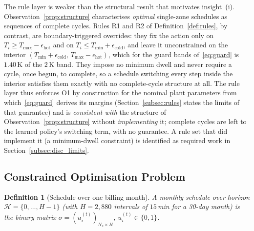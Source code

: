 \documentclass[3p,twocolumn,number]{elsarticle}
\newtheorem{definition}{Definition} \newtheorem{proposition}{Proposition} \newtheorem{remark}{Remark} \newtheorem{observation}{Observation} \newtheorem{corollary}{Corollary}
\newcommand{\sched}{\sigma}
\newcommand{\Tmin}{T_{\min}}
\newcommand{\Tmax}{T_{\max}}
\begin{document}
The rule layer is weaker than the structural result that motivates insight~(i). Observation~\ref{prop:structure} characterises \emph{optimal} single-zone schedules as sequences of complete cycles. Rules R1 and R2 of Definition~\ref{def:rules}, by contrast, are boundary-triggered overrides: they fix the action only on $T_i\ge\Tmax-\epsilon_{\mathrm{hot}}$ and on $T_i\le\Tmin+\epsilon_{\mathrm{cold}}$, and leave it unconstrained on the interior $(\Tmin+\epsilon_{\mathrm{cold}},\,\Tmax-\epsilon_{\mathrm{hot}})$, which for the guard bands of~\eqref{eq:guard} is $1.40\,$K of the $2\,$K band. They impose no minimum dwell and never require a cycle, once begun, to complete, so a schedule switching every step inside the interior satisfies them exactly with no complete-cycle structure at all. The rule layer thus enforces O1 by construction for the nominal plant parameters from which~\eqref{eq:guard} derives its margins (Section~\ref{subsec:rules} states the limits of that guarantee) and is \emph{consistent with} the structure of Observation~\ref{prop:structure} without \emph{implementing} it; complete cycles are left to the learned policy's switching term, with no guarantee. A rule set that did implement it (a minimum-dwell constraint) is identified as required work in Section~\ref{subsec:disc_limits}.
 
\subsection{Constrained Optimisation Problem}
\label{subsec:cop}
 
\begin{definition}[Schedule over one billing month]
\label{def:schedule}
A \emph{monthly schedule} over horizon $\mathcal{H}=\{0,\ldots,H-1\}$ (with $H=2{,}880$ intervals of $15\,$min for a 30-day month) is the binary matrix $\sched=(u_i^{(t)})_{N_z\times H}$, $u_i^{(t)}\in\{0,1\}$.
\end{definition}
 
\end{document}
